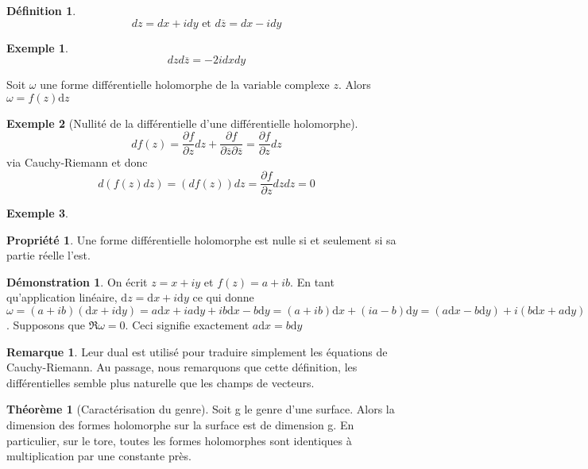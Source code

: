 \documentclass{article}
\theoremstyle{definition} %
\newtheorem{defi}{Définition}
\newtheorem{rmq}{Remarque}
\newtheorem{thm}{Théorème}
\newtheorem{ex}{Exemple}
\newtheorem{dem}{Démonstration}
\newtheorem{propri}{Propriété}
\newcommand{\derp}[2]{\frac{\partial {#1}}{\partial {#2}}}
\newcommand{\dd}{ \mathrm{d}}
\newcommand{\1}{\mathbb{1}} %
\begin{document}
\begin{defi}
$$dz=dx + i dy \text{ et } d \overline{z}= dx - i dy$$
\end{defi}

\begin{ex}
$$dz d\overline{z} = -2i dxdy$$
\end{ex}

\begin{tcolorbox}[colback=blue!5!white,colframe=blue!75!black,title=Unicité de la différentielle holomorphe]
Soit $\omega$ une forme différentielle holomorphe de la variable complexe $z$.
Alors $\omega = f(z) \dd z$
\end{tcolorbox}

\begin{ex}[Nullité de la différentielle d'une différentielle holomorphe]
$$df(z)=\derp{f}{z} dz + \derp{f}{\overline{z} \partial \overline{z}} = \derp{f}{z} dz$$ via Cauchy-Riemann et donc 
$$d(f(z)dz)=(df(z))dz= \derp{f}{z} dz dz=0$$
\end{ex}

\begin{ex}

\end{ex}

\begin{propri}
Une forme différentielle holomorphe est nulle si et seulement si sa partie réelle l'est.
\end{propri}

\begin{dem}
On écrit $z=x+iy$ et $f(z)=a+ib$.
En tant qu'application linéaire, $\dd z= \dd x + i \dd y $ ce qui donne $\omega = (a + ib) (\dd x + i \dd y)= a \dd x + i a \dd y + i b \dd x - b \dd y= (a+ib) \dd x + (ia - b) \dd y = (a \dd x - b \dd y) + i(b \dd x + a \dd y)$.
Supposons que $\Re \omega=0$.
Ceci signifie exactement $a \dd x = b \dd y$

\end{dem}

\begin{rmq}
Leur dual est utilisé pour traduire simplement les équations de Cauchy-Riemann.
Au passage, nous remarquons que cette définition, les différentielles semble plus naturelle que les champs de vecteurs.
\end{rmq}

\begin{thm}[Caractérisation du genre]
Soit g le genre d'une surface.
Alors la dimension des formes holomorphe sur la surface est de dimension g.
En particulier, sur le tore, toutes les formes holomorphes sont identiques à multiplication par une constante près.
\end{thm}
\end{document}
